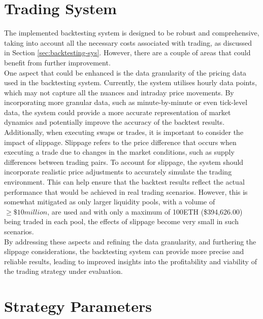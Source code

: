 \section{Trading System}
The implemented backtesting system is designed to be robust and comprehensive, taking into account all the necessary costs associated with trading, as discussed in Section \ref{sec:backtesting-sys}. However, there are a couple of areas that could benefit from further improvement.
\\[3mm]
One aspect that could be enhanced is the data granularity of the pricing data used in the backtesting system. Currently, the system utilises hourly data points, which may not capture all the nuances and intraday price movements. By incorporating more granular data, such as minute-by-minute or even tick-level data, the system could provide a more accurate representation of market dynamics and potentially improve the accuracy of the backtest results.
\\[3mm]
Additionally, when executing swaps or trades, it is important to consider the impact of slippage. Slippage refers to the price difference that occurs when executing a trade due to changes in the market conditions, such as supply differences between trading pairs. To account for slippage, the system should incorporate realistic price adjustments to accurately simulate the trading environment. This can help ensure that the backtest results reflect the actual performance that would be achieved in real trading scenarios. However, this is somewhat mitigated as only larger liquidity pools, with a volume of $\geq \$10 million$, are used and with only a maximum of 100ETH (\$394,626.00) being traded in each pool, the effects of slippage become very small in such scenarios.
\\[3mm]
By addressing these aspects and refining the data granularity, and furthering the slippage considerations, the backtesting system can provide more precise and reliable results, leading to improved insights into the profitability and viability of the trading strategy under evaluation.

\section{Strategy Parameters}

